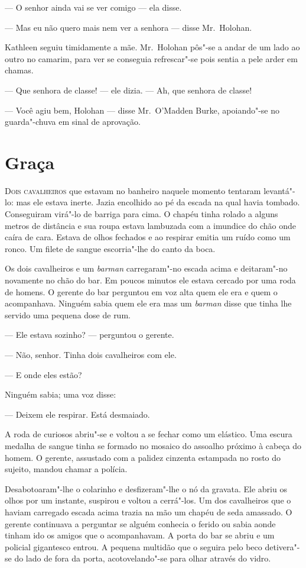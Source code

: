 --- O senhor ainda vai se ver comigo --- ela disse.

--- Mas eu não quero mais nem ver a senhora --- disse Mr.~Holohan.

Kathleen seguiu timidamente a mãe.  Mr.~Holohan pôs"-se a andar de um lado ao
outro no camarim, para ver se conseguia refrescar"-se pois sentia a pele arder
em chamas.

--- Que senhora de classe! --- ele dizia.  --- Ah, que senhora de classe!

--- Você agiu bem, Holohan --- disse Mr.~O’Madden Burke, apoiando"-se no
guarda"-chuva em sinal de aprovação.


\chapter{Graça}

\textsc{Dois cavalheiros} que estavam no banheiro naquele momento tentaram
levantá"-lo: mas ele estava inerte.  Jazia encolhido ao pé da escada na qual
havia tombado.  Conseguiram virá"-lo de barriga para cima.  O chapéu tinha
rolado a alguns metros de distância e sua roupa estava lambuzada com a imundice
do chão onde caíra de cara.  Estava de olhos fechados e ao respirar emitia um
ruído como um ronco.  Um filete de sangue escorria"-lhe do canto da boca.

Os dois cavalheiros e um \textit{barman} carregaram"-no escada acima e
deitaram"-no novamente no chão do bar.  Em poucos minutos ele estava cercado por
uma roda de homens.  O gerente do bar perguntou em voz alta quem ele era e quem
o acompanhava.  Ninguém sabia quem ele era mas um \textit{barman} disse que
tinha lhe servido uma pequena dose de rum.

--- Ele estava sozinho? --- perguntou o gerente.

--- Não, senhor.  Tinha dois cavalheiros com ele.

--- E onde eles estão?

Ninguém sabia; uma voz disse:

--- Deixem ele respirar.  Está desmaiado.

A roda de curiosos abriu"-se e voltou a se fechar como um elástico.  Uma escura
medalha de sangue tinha se formado no mosaico do assoalho próximo à cabeça do
homem.  O gerente, assustado com a palidez cinzenta estampada no rosto do
sujeito, mandou chamar a polícia.

Desabotoaram"-lhe o colarinho e desfizeram"-lhe o nó da gravata.  Ele abriu os
olhos por um instante, suspirou e voltou a cerrá"-los.  Um dos cavalheiros que o
haviam carregado escada acima trazia na mão um chapéu de seda amassado.  O
gerente continuava a perguntar se alguém conhecia o ferido ou sabia aonde
tinham ido os amigos que o acompanhavam.  A porta do bar se abriu e um policial
gigantesco entrou.  A pequena multidão que o seguira pelo beco detivera"-se do
lado de fora da porta, acotovelando"-se para olhar através do vidro.

